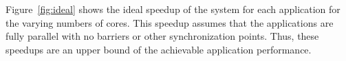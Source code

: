 Figure~\ref{fig:ideal} shows the ideal speedup of the system for each application for the varying numbers of cores. 
This speedup assumes that the applications are fully parallel with no barriers or other synchronization points. 
Thus, these speedups are an upper bound of the achievable application performance.
